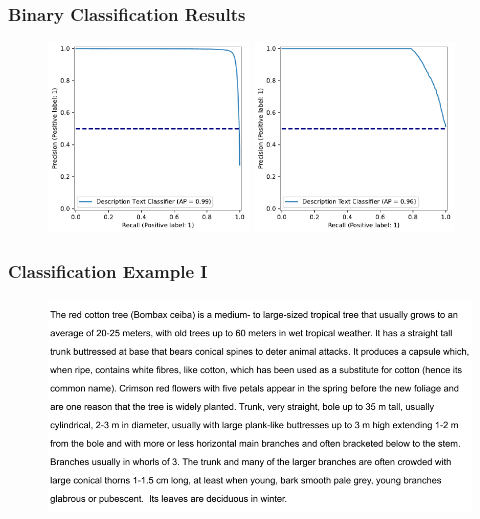 \documentclass{beamer}
\begin{document}
\begin{frame}
\frametitle{Binary Classification Results}
\begin{figure} [htbp]
    \centering
    \includegraphics[width=0.475\textwidth]{figures/precision_recall_plot.pdf}
      \hfill
    \includegraphics[width=0.475\textwidth]{figures/precision_recall_plot_extern.pdf}
\end{figure}
\end{frame}

\begin{frame}
\frametitle{Classification Example I}
\begin{figure} [htbp]
    \centering
    \includegraphics[width=\textwidth]{figures/web_crawler_example_sents_2.pdf}
\end{figure}
\end{frame}
\end{document}
